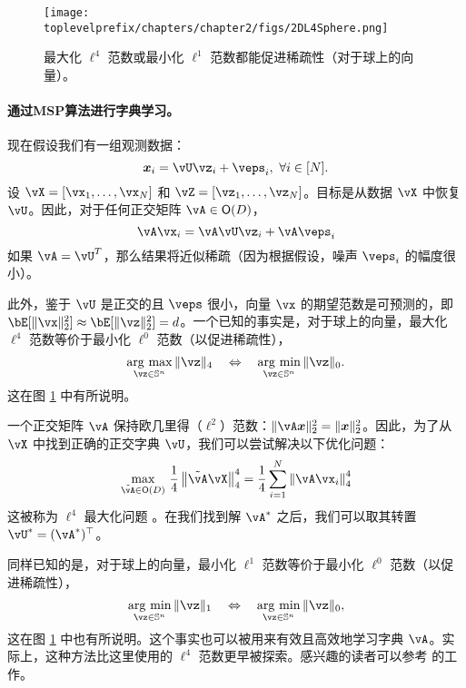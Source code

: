 \documentclass[../../book-main_zh.tex]{subfiles}
\begin{document}
\begin{figure}
    \centering
    \texttt{[image: \\toplevelprefix/chapters/chapter2/figs/2DL4Sphere.png]}\vspace{-0.1in}
    \caption{最大化 $\ell^4$ 范数或最小化 $\ell^1$ 范数都能促进稀疏性（对于球上的向量）。}
    \label{fig:L4-sphere}
\end{figure}


\paragraph{通过MSP算法进行字典学习。}

现在假设我们有一组观测数据：
\begin{equation}
    \x_i = \vU \vz_i + \veps_i,\ \forall i \in [N].
\end{equation}
设 $\vX = [\vx_1, \dots, \vx_N]$ 和 $\vZ = [\vz_1, \dots, \vz_N]$。目标是从数据 $\vX$ 中恢复 $\vU$。因此，对于任何正交矩阵 $\vA \in \O(D)$，
\begin{equation}
    \vA\vx_i = \vA\vU \vz_i + \vA\veps_i
\end{equation}
如果 $\vA = \vU^T$，那么结果将近似稀疏（因为根据假设，噪声 $\veps_i$ 的幅度很小）。

此外，鉴于 $\vU$ 是正交的且 $\veps$ 很小，向量 $\vx$ 的期望范数是可预测的，即 $\bE[\norm{\vx}_2^2] \approx \bE[\norm{\vz}_2^2]=d$。一个已知的事实是，对于球上的向量，最大化 $\ell^4$ 范数等价于最小化 $\ell^0$ 范数（以促进稀疏性），
\begin{equation}
    \argmax_{\vz \in \mathbb{S}^n}\|\vz\|_{4}\quad\Leftrightarrow\quad \argmin_{\vz \in \mathbb{S}^n}\|\vz\|_{0}.
\end{equation}
这在图 \ref{fig:L4-sphere} 中有所说明。

一个正交矩阵 $\vA$ 保持欧几里得（\(\ell^{2}\)）范数：$\|\vA \x\|_2^2 = \|\x\|_2^2$。因此，为了从 $\vX$ 中找到正确的正交字典 $\vU$，我们可以尝试解决以下优化问题：
\begin{equation}\label{eq0:orthogonal-dictionary-learning-l4}
    \max_{\tilde{\vA} \in \O(D)}\,
     \frac{1}{4} \norm*{
    \tilde{\vA} \vX
    }_4^4 =  \frac{1}{4} \sum_{i=1}^N \norm*{
    \vA \vx_i
    }_4^4
\end{equation}
这被称为 $\ell^4$ 最大化问题 \cite{Zhai-2020}。在我们找到解 \(\vA^{\ast}\) 之后，我们可以取其转置 \(\vU^{\ast} = (\vA^{\ast})^{\top}\)。
\begin{remark}
    同样已知的是，对于球上的向量，最小化 $\ell^1$ 范数等价于最小化 $\ell^0$ 范数（以促进稀疏性），
\begin{equation*}
            \argmin_{\vz \in \mathbb{S}^n}\|\vz\|_{1}\quad\Leftrightarrow\quad \argmin_{\vz \in \mathbb{S}^n}\|\vz\|_{0},
\end{equation*}
这在图 \ref{fig:L4-sphere} 中也有所说明。这个事实也可以被用来有效且高效地学习字典 $\vA$。实际上，这种方法比这里使用的 $\ell^4$ 范数更早被探索。感兴趣的读者可以参考 \cite{qu2020findingsparsestvectorssubspace} 的工作。
\end{remark}
\end{document}
